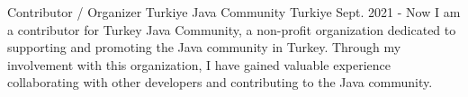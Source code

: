
\begin{cventries}

    \cventry
    {Contributor / Organizer} %
    {Turkiye Java Community} %
    {Turkiye} %
    {Sept. 2021 - Now} %
    {
        I am a contributor for Turkey Java Community, a non-profit organization dedicated to supporting and promoting the Java community in Turkey. Through my involvement with this organization, I have gained valuable experience collaborating with other developers and contributing to the Java community.
    }

\end{cventries}
